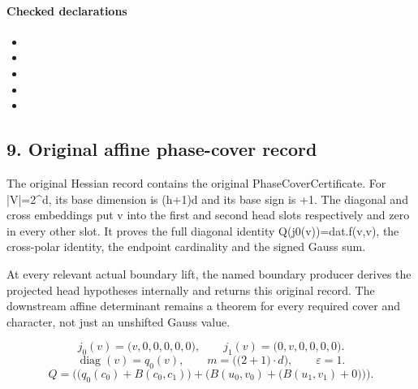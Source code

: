 \paragraph{Checked declarations}
\begin{itemize}
\item {}
\item {}
\item {}
\item {}
\item {}
\end{itemize}

\subsection*{9. Original affine phase-cover record}
The original Hessian record contains the original PhaseCoverCertificate. For |V|=2\textasciicircum{}d, its base dimension is (h+1)d and its base sign is +1. The diagonal and cross embeddings put v into the first and second head slots respectively and zero in every other slot. It proves the full diagonal identity Q(j0(v))=dat.f(v,v), the cross-polar identity, the endpoint cardinality and the signed Gauss sum.

At every relevant actual boundary lift, the named boundary producer derives the projected head hypotheses internally and returns this original record. The downstream affine determinant remains a theorem for every required cover and character, not just an unshifted Gauss value.

\[j_0(v)=\bigl(v,0,0,0,0,0\bigr),\qquad j_1(v)=\bigl(0,v,0,0,0,0\bigr).\]
\[\operatorname{diag}(v)=q_0(v),\qquad m=\bigl(\bigl(2+1\bigr)\cdot d\bigr),\qquad \varepsilon=1.\]
\[Q=\bigl(\bigl(q_0(c_0)+B(c_0,c_1)\bigr)+\bigl(B(u_{0},v_{0})+\bigl(B(u_{1},v_{1})+0\bigr)\bigr)\bigr).\]

